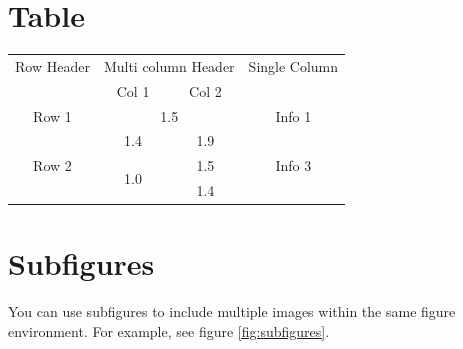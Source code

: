 \documentclass{article}
\begin{document}
\section{Table}
\begin{tabular}{|c|c|c|c|}
\hline
Row Header & \multicolumn{2}{c|}{Multi column Header} & Single Column \\
\cline{2-3}
& Col 1 & Col 2 & \\
\hline
Row 1 & \multicolumn{2}{c|}{1.5} & Info 1 \\
\cline{2-3}
& 1.4 & 1.9 & \\
\hline
Row 2 & \multirow{2}{*}{1.0} & 1.5 & Info 3 \\
\cline{3-3}
& & 1.4 & \\
\hline
\end{tabular}

\pagebreak


\section{Subfigures}
You can use subfigures to include multiple images within the same figure environment. For example, see figure \ref{fig:subfigures}.
\end{document}
